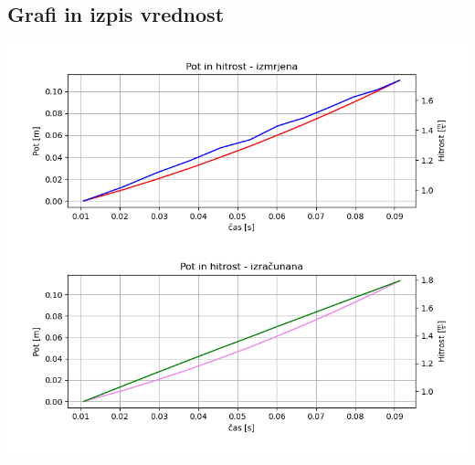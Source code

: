 \documentclass[12pt]{article}
\begin{document}
 	\subsection*{Grafi in izpis vrednost}

	\includegraphics[width=\linewidth]{slike/graf_v2_1.png}
\end{document}
